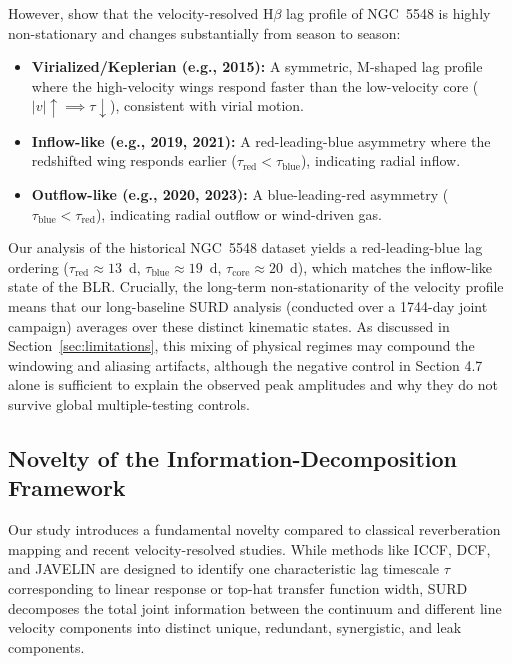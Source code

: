 \documentclass[fleqn,usenatbib]{mnras}
\begin{document}
However, \citet{Xi2025} show that the velocity-resolved H\(\beta\) lag profile of NGC~5548 is highly non-stationary and changes substantially from season to season:
\begin{itemize}
    \item \textbf{Virialized/Keplerian (e.g., 2015):} A symmetric, M-shaped lag profile where the high-velocity wings respond faster than the low-velocity core ($|v| \uparrow \implies \tau \downarrow$), consistent with virial motion.
    \item \textbf{Inflow-like (e.g., 2019, 2021):} A red-leading-blue asymmetry where the redshifted wing responds earlier ($\tau_{\mathrm{red}} < \tau_{\mathrm{blue}}$), indicating radial inflow.
    \item \textbf{Outflow-like (e.g., 2020, 2023):} A blue-leading-red asymmetry ($\tau_{\mathrm{blue}} < \tau_{\mathrm{red}}$), indicating radial outflow or wind-driven gas.
\end{itemize}
Our analysis of the historical NGC~5548 dataset yields a red-leading-blue lag ordering (\(\tau_{\mathrm{red}} \approx 13\)~d, \(\tau_{\mathrm{blue}} \approx 19\)~d, \(\tau_{\mathrm{core}} \approx 20\)~d), which matches the inflow-like state of the BLR. Crucially, the long-term non-stationarity of the velocity profile means that our long-baseline SURD analysis (conducted over a 1744-day joint campaign) averages over these distinct kinematic states. As discussed in Section~\ref{sec:limitations}, this mixing of physical regimes may compound the windowing and aliasing artifacts, although the negative control in Section 4.7 alone is sufficient to explain the observed peak amplitudes and why they do not survive global multiple-testing controls.

\subsection{Novelty of the Information-Decomposition Framework}
\label{sec:novelty_framework}

Our study introduces a fundamental novelty compared to classical reverberation mapping and recent velocity-resolved studies. While methods like ICCF, DCF, and JAVELIN are designed to identify one characteristic lag timescale $\tau$ corresponding to linear response or top-hat transfer function width, SURD decomposes the total joint information between the continuum and different line velocity components into distinct unique, redundant, synergistic, and leak components.
\end{document}
